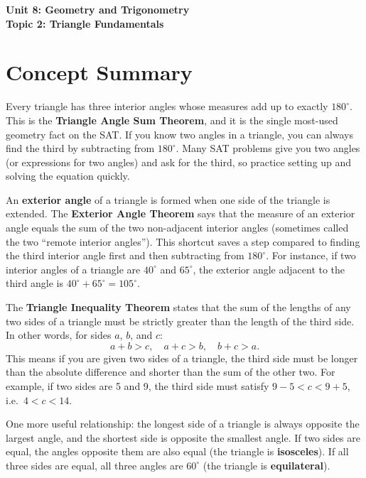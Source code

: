 \documentclass[14pt]{extarticle}
\begin{document}
\raggedright
{}

\begin{center}
    \LARGE \textbf{Unit 8: Geometry and Trigonometry} \\[6pt]
    \Large \textbf{Topic 2: Triangle Fundamentals}
\end{center}

\vspace{1em}

\section*{Concept Summary}

Every triangle has three interior angles whose measures add up to exactly \(180^\circ\). This is the \textbf{Triangle Angle Sum Theorem}, and it is the single most-used geometry fact on the SAT. If you know two angles in a triangle, you can always find the third by subtracting from \(180^\circ\). Many SAT problems give you two angles (or expressions for two angles) and ask for the third, so practice setting up and solving the equation quickly.

An \textbf{exterior angle} of a triangle is formed when one side of the triangle is extended. The \textbf{Exterior Angle Theorem} says that the measure of an exterior angle equals the sum of the two non-adjacent interior angles (sometimes called the two ``remote interior angles''). This shortcut saves a step compared to finding the third interior angle first and then subtracting from \(180^\circ\). For instance, if two interior angles of a triangle are \(40^\circ\) and \(65^\circ\), the exterior angle adjacent to the third angle is \(40^\circ + 65^\circ = 105^\circ\).

The \textbf{Triangle Inequality Theorem} states that the sum of the lengths of any two sides of a triangle must be strictly greater than the length of the third side. In other words, for sides \(a\), \(b\), and \(c\):
\[
a + b > c, \quad a + c > b, \quad b + c > a.
\]
This means if you are given two sides of a triangle, the third side must be longer than the absolute difference and shorter than the sum of the other two. For example, if two sides are 5 and 9, the third side must satisfy \(9 - 5 < c < 9 + 5\), i.e.\ \(4 < c < 14\).

One more useful relationship: the longest side of a triangle is always opposite the largest angle, and the shortest side is opposite the smallest angle. If two sides are equal, the angles opposite them are also equal (the triangle is \textbf{isosceles}). If all three sides are equal, all three angles are \(60^\circ\) (the triangle is \textbf{equilateral}).
\end{document}
